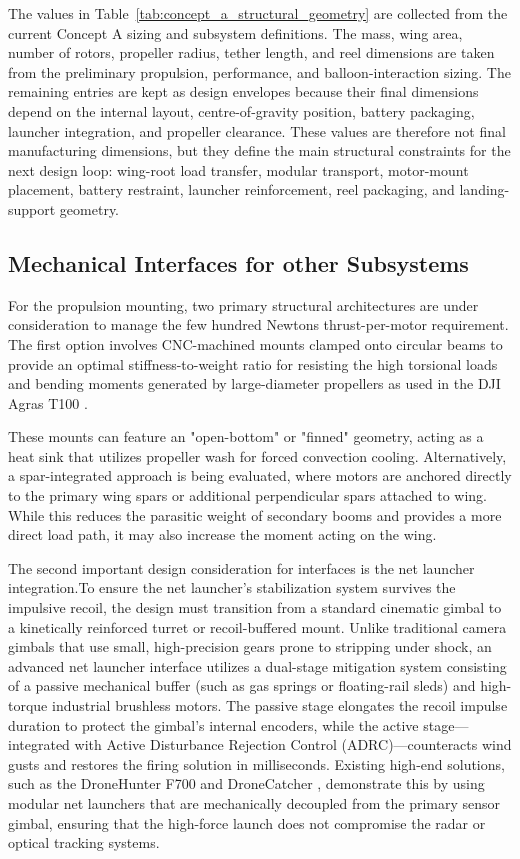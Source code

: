 The values in Table~\ref{tab:concept_a_structural_geometry} are collected from the current Concept A sizing and subsystem definitions. The mass, wing area, number of rotors, propeller radius, tether length, and reel dimensions are taken from the preliminary propulsion, performance, and balloon-interaction sizing. The remaining entries are kept as design envelopes because their final dimensions depend on the internal layout, centre-of-gravity position, battery packaging, launcher integration, and propeller clearance. These values are therefore not final manufacturing dimensions, but they define the main structural constraints for the next design loop: wing-root load transfer, modular transport, motor-mount placement, battery restraint, launcher reinforcement, reel packaging, and landing-support geometry.


\subsection{Mechanical Interfaces for other Subsystems}



For the propulsion mounting, two primary structural architectures are under consideration to manage the few hundred Newtons thrust-per-motor requirement. The first option involves CNC-machined mounts clamped onto circular beams to provide an optimal stiffness-to-weight ratio for resisting the high torsional loads and bending moments generated by large-diameter propellers as used in the DJI Agras T100 \cite{DJI2025DJIT100}.

These mounts can feature an "open-bottom" or "finned" geometry, acting as a heat sink that utilizes propeller wash for forced convection cooling. Alternatively, a spar-integrated approach is being evaluated, where motors are anchored directly to the primary wing spars or additional perpendicular spars attached to wing. While this reduces the parasitic weight of secondary booms and provides a more direct load path, it may also increase the moment acting on the wing.

The second important design consideration for interfaces is the net launcher integration.To ensure the net launcher's stabilization system survives the impulsive recoil, the design must transition from a standard cinematic gimbal to a kinetically reinforced turret or recoil-buffered mount. Unlike traditional camera gimbals that use small, high-precision gears prone to stripping under shock, an advanced net launcher interface utilizes a dual-stage mitigation system consisting of a passive mechanical buffer (such as gas springs or floating-rail sleds) and high-torque industrial brushless motors. The passive stage elongates the recoil impulse duration to protect the gimbal's internal encoders, while the active stage—integrated with Active Disturbance Rejection Control (ADRC)—counteracts wind gusts and restores the firing solution in milliseconds. Existing high-end solutions, such as the DroneHunter F700 \cite{Fortem} and DroneCatcher \cite{DroneCatcher}, demonstrate this by using modular net launchers that are mechanically decoupled from the primary sensor gimbal, ensuring that the high-force launch does not compromise the radar or optical tracking systems. 

